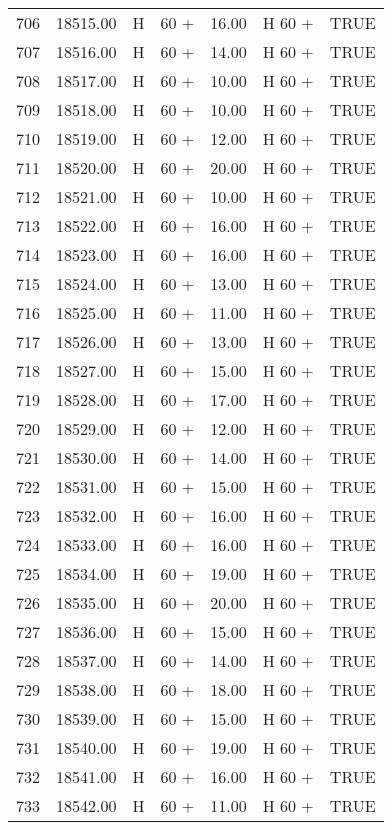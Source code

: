 \begin{table}[ht]
\begin{tabular}{rrllrll}
  706 & 18515.00 & H & 60 + & 16.00 & H 60 + & TRUE \\ 
  707 & 18516.00 & H & 60 + & 14.00 & H 60 + & TRUE \\ 
  708 & 18517.00 & H & 60 + & 10.00 & H 60 + & TRUE \\ 
  709 & 18518.00 & H & 60 + & 10.00 & H 60 + & TRUE \\ 
  710 & 18519.00 & H & 60 + & 12.00 & H 60 + & TRUE \\ 
  711 & 18520.00 & H & 60 + & 20.00 & H 60 + & TRUE \\ 
  712 & 18521.00 & H & 60 + & 10.00 & H 60 + & TRUE \\ 
  713 & 18522.00 & H & 60 + & 16.00 & H 60 + & TRUE \\ 
  714 & 18523.00 & H & 60 + & 16.00 & H 60 + & TRUE \\ 
  715 & 18524.00 & H & 60 + & 13.00 & H 60 + & TRUE \\ 
  716 & 18525.00 & H & 60 + & 11.00 & H 60 + & TRUE \\ 
  717 & 18526.00 & H & 60 + & 13.00 & H 60 + & TRUE \\ 
  718 & 18527.00 & H & 60 + & 15.00 & H 60 + & TRUE \\ 
  719 & 18528.00 & H & 60 + & 17.00 & H 60 + & TRUE \\ 
  720 & 18529.00 & H & 60 + & 12.00 & H 60 + & TRUE \\ 
  721 & 18530.00 & H & 60 + & 14.00 & H 60 + & TRUE \\ 
  722 & 18531.00 & H & 60 + & 15.00 & H 60 + & TRUE \\ 
  723 & 18532.00 & H & 60 + & 16.00 & H 60 + & TRUE \\ 
  724 & 18533.00 & H & 60 + & 16.00 & H 60 + & TRUE \\ 
  725 & 18534.00 & H & 60 + & 19.00 & H 60 + & TRUE \\ 
  726 & 18535.00 & H & 60 + & 20.00 & H 60 + & TRUE \\ 
  727 & 18536.00 & H & 60 + & 15.00 & H 60 + & TRUE \\ 
  728 & 18537.00 & H & 60 + & 14.00 & H 60 + & TRUE \\ 
  729 & 18538.00 & H & 60 + & 18.00 & H 60 + & TRUE \\ 
  730 & 18539.00 & H & 60 + & 15.00 & H 60 + & TRUE \\ 
  731 & 18540.00 & H & 60 + & 19.00 & H 60 + & TRUE \\ 
  732 & 18541.00 & H & 60 + & 16.00 & H 60 + & TRUE \\ 
  733 & 18542.00 & H & 60 + & 11.00 & H 60 + & TRUE \\ 

\end{tabular}
\end{table}
